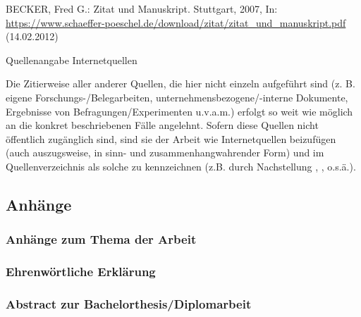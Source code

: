 \begin{example}[H]
    \begin{framed}
        BECKER, Fred G.: Zitat und Manuskript. Stuttgart, 2007, In: \href{https://www.schaeffer-poeschel.de/download/zitat/zitat_und_manuskript.pdf}{https://www.schaeffer-poeschel.de/download/zitat/zitat\_und\_manuskript.pdf} (14.02.2012)
    \end{framed}
    \caption{Quellenangabe Internetquellen}
    \label{bsp-quelle-internetquellen}
\end{example}

Die Zitierweise aller anderer Quellen, die hier nicht einzeln aufgeführt sind (z. B. eigene Forschungs-/Belegarbeiten, unternehmensbezogene/-interne Dokumente, Ergebnisse von Befragungen/Experimenten u.v.a.m.) erfolgt so weit wie möglich an die konkret beschriebenen Fälle angelehnt.
Sofern diese Quellen nicht öffentlich zugänglich sind, sind sie der Arbeit wie Internetquellen beizufügen (auch auszugsweise, in sinn- und zusammenhangwahrender Form) und im Quellenverzeichnis als solche zu kennzeichnen (z.B. durch Nachstellung , , o.s.ä.).

\subsection{Anhänge}
\label{formal-gestaltung-anhaenge}
\subsubsection{Anhänge zum Thema der Arbeit}
\label{formal-gestaltung-anhaenge-anhaenge}
\subsubsection{Ehrenwörtliche Erklärung}
\label{formal-gestaltung-anhaenge-erklaerung}
\subsubsection{Abstract zur Bachelorthesis/Diplomarbeit}
\label{formal-gestaltung-anhaenge-abstract}
